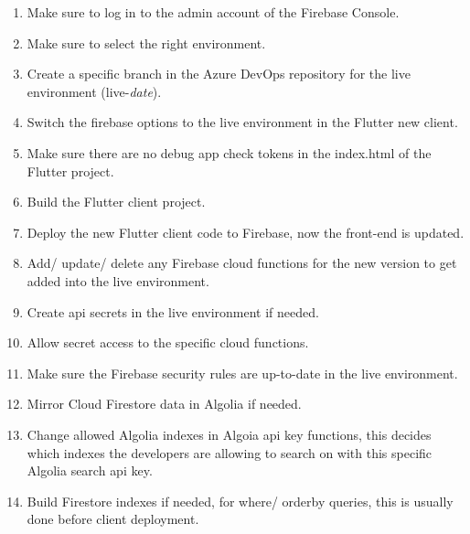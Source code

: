 \begin{enumerate}
  \item Make sure to log in to the admin account of the Firebase Console.
  \item Make sure to select the right environment.
  \item Create a specific branch in the Azure DevOps repository for the live environment (live-\textit{date}).
  \item Switch the firebase options to the live environment in the Flutter new client.
  \item Make sure there are no debug app check tokens in the index.html of the Flutter project.
  \item Build the Flutter client project.
  \item Deploy the new Flutter client code to Firebase, now the front-end is updated.
  \item Add/ update/ delete any Firebase cloud functions for the new version to get added into the live environment.
  \item Create \acrshort{api} secrets in the live environment if needed.
  \item Allow secret access to the specific cloud functions.
  \item Make sure the Firebase security rules are up-to-date in the live environment.
  \item Mirror Cloud Firestore data in Algolia if needed.
  \item Change allowed Algolia indexes in Algoia \acrshort{api} key functions, this decides which indexes the developers
        are allowing to search on with this specific Algolia search \acrshort{api} key.
  \item Build Firestore indexes if needed, for where/ orderby queries, this is usually done before client deployment.
\end{enumerate}